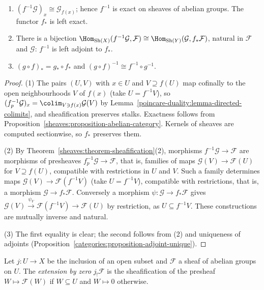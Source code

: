 \begin{proposition}\label{sheaves:proposition-images}
\begin{enumerate}
\item $(f^{-1}\mathcal{G})_x \cong \mathcal{G}_{f(x)}$; hence $f^{-1}$ is exact on sheaves of abelian groups. The functor $f_*$ is left exact.
\item There is a bijection $\Hom_{\mathrm{Sh}(X)}(f^{-1}\mathcal{G}, \mathcal{F}) \cong \Hom_{\mathrm{Sh}(Y)}(\mathcal{G}, f_*\mathcal{F})$, natural in $\mathcal{F}$ and $\mathcal{G}$: $f^{-1}$ is left adjoint to
$f_*$.
\item $(g \circ f)_* = g_* \circ f_*$ and $(g \circ f)^{-1} \cong f^{-1} \circ g^{-1}$.
\end{enumerate}
\end{proposition}

\begin{proof}
(1) The pairs $(U, V)$ with $x \in U$ and $V \supseteq f(U)$ map cofinally to the open neighbourhoods $V$ of $f(x)$ (take $U = f^{-1}V$), so
$(f^{-1}_p\mathcal{G})_x = \colim_{V \ni f(x)}\mathcal{G}(V)$ by Lemma~\ref{poincare-duality:lemma-directed-colimits}, and sheafification preserves stalks. Exactness follows from
Proposition~\ref{sheaves:proposition-abelian-category}. Kernels of sheaves are computed sectionwise, so $f_*$ preserves them.

(2) By Theorem~\ref{sheaves:theorem-sheafification}(2), morphisms $f^{-1}\mathcal{G} \to \mathcal{F}$ are morphisms of presheaves $f_p^{-1}\mathcal{G} \to \mathcal{F}$, that is, families of
maps $\mathcal{G}(V) \to \mathcal{F}(U)$ for $V \supseteq f(U)$, compatible with restrictions in $U$ and $V$. Such a family determines maps $\mathcal{G}(V) \to \mathcal{F}(f^{-1}V)$ (take
$U = f^{-1}V$), compatible with restrictions, that is, a morphism $\mathcal{G} \to f_*\mathcal{F}$. Conversely a morphism $\psi \colon \mathcal{G} \to f_*\mathcal{F}$ gives
$\mathcal{G}(V) \xrightarrow{\psi_V} \mathcal{F}(f^{-1}V) \to \mathcal{F}(U)$ by restriction, as $U \subseteq f^{-1}V$. These constructions are mutually inverse and natural.

(3) The first equality is clear; the second follows from (2) and uniqueness of adjoints (Proposition~\ref{categories:proposition-adjoint-unique}).
\end{proof}

\begin{definition}\label{sheaves:definition-extension-by-zero}
Let $j \colon U \to X$ be the inclusion of an open subset and $\mathcal{F}$ a sheaf of abelian groups on $U$. The \emph{extension by zero} $j_!\mathcal{F}$ is the sheafification of the
presheaf $W \mapsto \mathcal{F}(W)$ if $W \subseteq U$ and $W \mapsto 0$ otherwise.
\end{definition}

